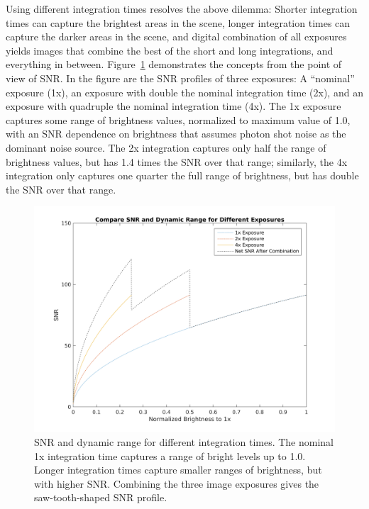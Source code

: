 \documentclass[]{spieman}  %
\begin{document}
Using different integration times resolves the above dilemma: Shorter integration times can capture the brightest areas in the scene, longer integration times can capture the darker areas in the scene, and digital combination of all exposures yields images that combine the best of the short and long integrations, and everything in between.  Figure~\ref{fig:hdr_snr_example} demonstrates the concepts from the point of view of SNR. In the figure are the SNR profiles of three exposures:  A ``nominal'' exposure (1x), an exposure with double the nominal integration time (2x), and an exposure with quadruple the nominal integration time (4x). The 1x exposure captures some range of brightness values, normalized to maximum value of 1.0, with an SNR dependence on brightness that assumes photon shot noise as the dominant noise source. The 2x integration captures only half the range of brightness values, but has 1.4 times the SNR over that range; similarly, the 4x integration only captures one quarter the full range of brightness, but has double the SNR over that range.

\begin{figure}
  \centering
  \includegraphics[width=\columnwidth]{figures/hdr-design-snr-hdr-examples.png}
  \caption{SNR and dynamic range for different integration times. The nominal 1x integration time captures a range of bright levels up to 1.0.  Longer integration times capture smaller ranges of brightness, but with higher SNR. Combining the three image exposures gives the saw-tooth-shaped SNR profile. \label{fig:hdr_snr_example}}
\end{figure}
\end{document}
